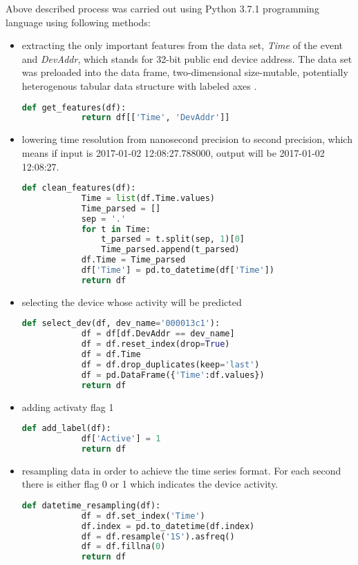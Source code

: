 Above described process was carried out using Python 3.7.1 programming language using following methods:
\begin{itemize}
    \item extracting the only important features from the data set, \textit{Time} of the event and \textit{DevAddr}, which stands for 32-bit public end device address. The data set was preloaded into the data frame, two-dimensional size-mutable, potentially heterogenous tabular data structure with labeled axes \cite{df} .
    \begin{lstlisting}[language=Python]
        def get_features(df):
            return df[['Time', 'DevAddr']]
    \end{lstlisting}
    \item lowering time resolution from nanosecond precision to second precision, which means if input is 2017-01-02 12:08:27.788000, output will be 2017-01-02 12:08:27.
    \begin{lstlisting}[language=Python]
        def clean_features(df):
            Time = list(df.Time.values)
            Time_parsed = []
            sep = '.'
            for t in Time:
                t_parsed = t.split(sep, 1)[0]
                Time_parsed.append(t_parsed)
            df.Time = Time_parsed
            df['Time'] = pd.to_datetime(df['Time'])
            return df
    \end{lstlisting}
    \item selecting the device whose activity will be predicted
    \begin{lstlisting}[language=Python]
        def select_dev(df, dev_name='000013c1'):
            df = df[df.DevAddr == dev_name]
            df = df.reset_index(drop=True)
            df = df.Time
            df = df.drop_duplicates(keep='last')
            df = pd.DataFrame({'Time':df.values})
            return df
    \end{lstlisting}
    \item adding activaty flag 1
    \begin{lstlisting}[language=Python]
        def add_label(df):
            df['Active'] = 1
            return df
    \end{lstlisting}
    \item resampling data in order to achieve the time series format. For each second there is either flag 0 or 1 which indicates the device activity.
    \begin{lstlisting}[language=Python]
        def datetime_resampling(df):
            df = df.set_index('Time')
            df.index = pd.to_datetime(df.index)
            df = df.resample('1S').asfreq()
            df = df.fillna(0)
            return df
    \end{lstlisting}
\end{itemize}

